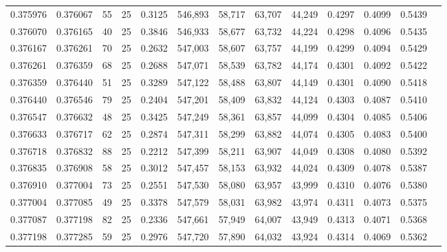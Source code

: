 \begin{tabular}{rrrrrrrrrrrrr}
0.375976 & 0.376067 &    55 &  25 &                                     0.3125 & 546,893 &  58,717 &  63,707 &  44,249 & 0.4297 & 0.4099 & 0.5439 \\
0.376070 & 0.376165 &    40 &  25 &                                     0.3846 & 546,933 &  58,677 &  63,732 &  44,224 & 0.4298 & 0.4096 & 0.5435 \\
0.376167 & 0.376261 &    70 &  25 &                                     0.2632 & 547,003 &  58,607 &  63,757 &  44,199 & 0.4299 & 0.4094 & 0.5429 \\
0.376261 & 0.376359 &    68 &  25 &                                     0.2688 & 547,071 &  58,539 &  63,782 &  44,174 & 0.4301 & 0.4092 & 0.5422 \\
0.376359 & 0.376440 &    51 &  25 &                                     0.3289 & 547,122 &  58,488 &  63,807 &  44,149 & 0.4301 & 0.4090 & 0.5418 \\
0.376440 & 0.376546 &    79 &  25 &                                     0.2404 & 547,201 &  58,409 &  63,832 &  44,124 & 0.4303 & 0.4087 & 0.5410 \\
0.376547 & 0.376632 &    48 &  25 &                                     0.3425 & 547,249 &  58,361 &  63,857 &  44,099 & 0.4304 & 0.4085 & 0.5406 \\
0.376633 & 0.376717 &    62 &  25 &                                     0.2874 & 547,311 &  58,299 &  63,882 &  44,074 & 0.4305 & 0.4083 & 0.5400 \\
0.376718 & 0.376832 &    88 &  25 &                                     0.2212 & 547,399 &  58,211 &  63,907 &  44,049 & 0.4308 & 0.4080 & 0.5392 \\
0.376835 & 0.376908 &    58 &  25 &                                     0.3012 & 547,457 &  58,153 &  63,932 &  44,024 & 0.4309 & 0.4078 & 0.5387 \\
0.376910 & 0.377004 &    73 &  25 &                                     0.2551 & 547,530 &  58,080 &  63,957 &  43,999 & 0.4310 & 0.4076 & 0.5380 \\
0.377004 & 0.377085 &    49 &  25 &                                     0.3378 & 547,579 &  58,031 &  63,982 &  43,974 & 0.4311 & 0.4073 & 0.5375 \\
0.377087 & 0.377198 &    82 &  25 &                                     0.2336 & 547,661 &  57,949 &  64,007 &  43,949 & 0.4313 & 0.4071 & 0.5368 \\
0.377198 & 0.377285 &    59 &  25 &                                     0.2976 & 547,720 &  57,890 &  64,032 &  43,924 & 0.4314 & 0.4069 & 0.5362 \\

\end{tabular}
